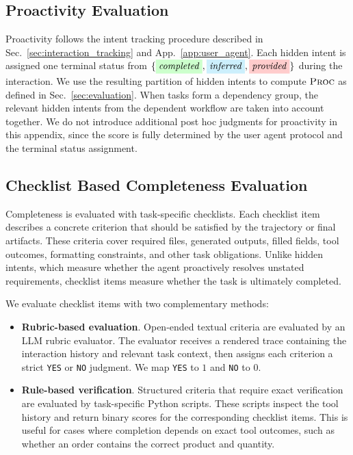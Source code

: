 \documentclass{llmxive}
\providecommand{\completed}{\colorbox{green!20}{\textit{completed}}}
\providecommand{\inferred}{\colorbox{cyan!20}{\textit{inferred}}}
\providecommand{\provided}{\colorbox{red!20}{\textit{provided}}}
\begin{document}
\subsection{Proactivity Evaluation}
\label{app:eval_proactivity}

Proactivity follows the intent tracking procedure described in Sec.~\ref{sec:interaction_tracking} and App.~\ref{app:user_agent}. Each hidden intent is assigned one terminal status from $\{\completed,\inferred,\provided\}$ during the interaction. We use the resulting partition of hidden intents to compute $\textsc{Proc}$ as defined in Sec.~\ref{sec:evaluation}. When tasks form a dependency group, the relevant hidden intents from the dependent workflow are taken into account together. We do not introduce additional post hoc judgments for proactivity in this appendix, since the score is fully determined by the user agent protocol and the terminal status assignment.

\subsection{Checklist Based Completeness Evaluation}
\label{app:eval_completeness}

Completeness is evaluated with task-specific checklists. Each checklist item describes a concrete criterion that should be satisfied by the trajectory or final artifacts. These criteria cover required files, generated outputs, filled fields, tool outcomes, formatting constraints, and other task obligations. Unlike hidden intents, which measure whether the agent proactively resolves unstated requirements, checklist items measure whether the task is ultimately completed.

We evaluate checklist items with two complementary methods:
\begin{itemize}[leftmargin=10pt, topsep=0pt, itemsep=1pt, partopsep=1pt, parsep=1pt]
    \item \textbf{Rubric-based evaluation}. Open-ended textual criteria are evaluated by an LLM rubric evaluator. The evaluator receives a rendered trace containing the interaction history and relevant task context, then assigns each criterion a strict \texttt{YES} or \texttt{NO} judgment. We map \texttt{YES} to $1$ and \texttt{NO} to $0$.

    \item \textbf{Rule-based verification}. Structured criteria that require exact verification are evaluated by task-specific Python scripts. These scripts inspect the tool history and return binary scores for the corresponding checklist items. This is useful for cases where completion depends on exact tool outcomes, such as whether an order contains the correct product and quantity.
\end{itemize}
\end{document}
